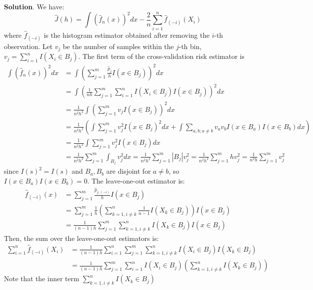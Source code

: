 \textbf{Solution}.
We have:
\[
\hat{J}(h) = \int \left( \hat{f}_{n}(x) \right)^{2} dx - \frac{2}{n} \sum_{i=1}^{n} \hat{f}_{(-i)}(X_{i})
\]
where \(\hat{f}_{(-i)}\) is the histogram estimator obtained after
removing the \(i\)-th observation.
Let \(v_{j}\) be the number of samples within the \(j\)-th bin,
\(v_{j} = \sum_{i=1}^{n} I(X_{i} \in B_{j})\).
The first term of the cross-validation risk estimator is
\begin{align*}
\int \left( \hat{f}_{n}(x) \right)^{2} dx &= \int \left( \sum_{j=1}^m \frac{\hat{p}_{j}}{h} I(x \in B_{j}) \right)^{2} dx\\
&= \int \left( \frac{1}{nh}  \sum_{j=1}^m \sum_{i=1}^{n} I(X_{i} \in B_{j}) I(x \in B_{j}) \right)^{2} dx \\
&= \frac{1}{n^{2}h^{2}} \int \left( \sum_{j=1}^m v_{j} I(x \in B_{j}) \right)^{2} dx \\
&= \frac{1}{n^{2}h^{2}} \left( \int \sum_{j=1}^m v_{j}^{2} I(x \in B_{j})^{2} dx  + \int \sum_{a, b; a \neq b}  v_a v_b I(x \in B_a) I(x \in B_b) dx\right) \\
&= \frac{1}{n^{2}h^{2}} \int \sum_{j=1}^m v_{j}^{2} I(x \in B_{j}) dx \\
&= \frac{1}{n^{2}h^{2}} \sum_{j=1}^m \int_{B_{j}} v_{j}^{2} dx = \frac{1}{n^{2}h^{2}} \sum_{j=1}^m \left| B_{j} \right| v_{j}^{2} = \frac{1}{n^{2}h^{2}} \sum_{j=1}^m h v_{j}^{2} = \frac{1}{n^{2}h} \sum_{j=1}^m v_{j}^{2}
\end{align*}
since \(I(s)^{2} = I(s)\) and \(B_a, B_b\) are disjoint for \(a \neq b\),
so \(I(x \in B_a) I(x \in B_b) = 0\).
The leave-one-out estimator is:
\begin{align*}
\hat{f}_{(-i)}(x) &= \sum_{j=1}^m \frac{\hat{p}_{j, (-i)}}{h} I(x \in B_{j}) \\
&= \sum_{j=1}^m \frac{1}{h} \left( \sum_{k=1, i \neq k}^{n} \frac{1}{n - 1} I(X_{k} \in B_{j}) \right) I(x \in B_{j}) \\
&= \frac{1}{(n - 1)h} \sum_{j=1}^m \sum_{k=1, i \neq k}^{n} I(X_{k} \in B_{j}) I(x \in B_{j})
\end{align*}
Then, the sum over the leave-one-out estimators is:
\begin{align*}
\sum_{i=1}^{n} \hat{f}_{(-i)}(X_{i}) &= \frac{1}{(n - 1)h} \sum_{i=1}^{n} \sum_{j=1}^m \sum_{k=1, i \neq k}^{n} I(X_{i} \in B_{j}) I(X_{k} \in B_{j}) \\
&= \frac{1}{(n - 1)h} \sum_{j=1}^m \sum_{i=1}^{n} I(X_{i} \in B_{j})\left( \sum_{k=1, i \neq k}^{n} I(X_{k} \in B_{j}) \right)
\end{align*}
Note that the inner term \(\sum_{k=1, i \neq k}^{n} I(X_{k} \in B_{j})\)
